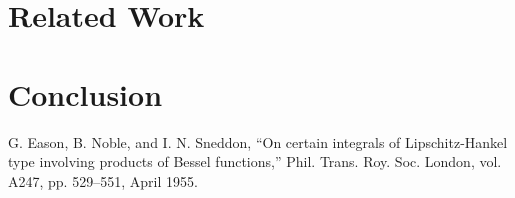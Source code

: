 \documentclass[conference]{IEEEtran}
\begin{document}
\section{Related Work}

\section{Conclusion}

\begin{thebibliography}{00}
 G. Eason, B. Noble, and I. N. Sneddon, ``On certain integrals of Lipschitz-Hankel type involving products of Bessel functions,'' Phil. Trans. Roy. Soc. London, vol. A247, pp. 529--551, April 1955.

\end{thebibliography}
\end{document}
